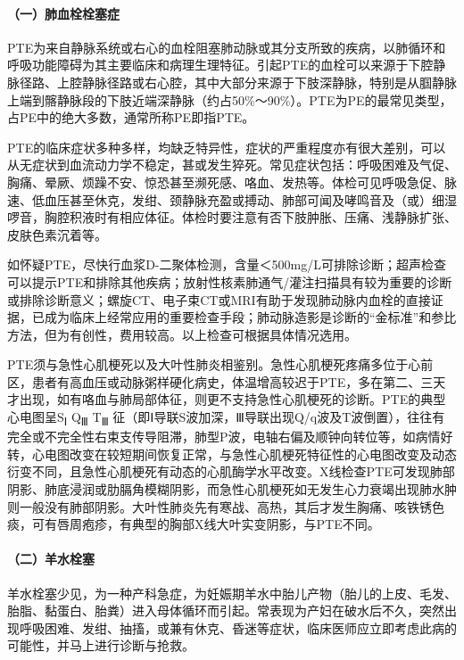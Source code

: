\paragraph{（一）肺血栓栓塞症}

PTE为来自静脉系统或右心的血栓阻塞肺动脉或其分支所致的疾病，以肺循环和呼吸功能障碍为其主要临床和病理生理特征。引起PTE的血栓可以来源于下腔静脉径路、上腔静脉径路或右心腔，其中大部分来源于下肢深静脉，特别是从腘静脉上端到髂静脉段的下肢近端深静脉（约占50\%～90\%）。PTE为PE的最常见类型，占PE中的绝大多数，通常所称PE即指PTE。

PTE的临床症状多种多样，均缺乏特异性，症状的严重程度亦有很大差别，可以从无症状到血流动力学不稳定，甚或发生猝死。常见症状包括：呼吸困难及气促、胸痛、晕厥、烦躁不安、惊恐甚至濒死感、咯血、发热等。体检可见呼吸急促、脉速、低血压甚至休克，发绀、颈静脉充盈或搏动、肺部可闻及哮鸣音及（或）细湿啰音，胸腔积液时有相应体征。体检时要注意有否下肢肿胀、压痛、浅静脉扩张、皮肤色素沉着等。

如怀疑PTE，尽快行血浆D-二聚体检测，含量＜500mg/L可排除诊断；超声检查可以提示PTE和排除其他疾病；放射性核素肺通气/灌注扫描具有较为重要的诊断或排除诊断意义；螺旋CT、电子束CT或MRI有助于发现肺动脉内血栓的直接证据，已成为临床上经常应用的重要检查手段；肺动脉造影是诊断的“金标准”和参比方法，但为有创性，费用较高。以上检查可根据具体情况选用。

PTE须与急性心肌梗死以及大叶性肺炎相鉴别。急性心肌梗死疼痛多位于心前区，患者有高血压或动脉粥样硬化病史，体温增高较迟于PTE，多在第二、三天才出现，如有咯血与肺局部体征，则更不支持急性心肌梗死的诊断。PTE的典型心电图呈S\textsubscript{Ⅰ}
Q\textsubscript{Ⅲ} T\textsubscript{Ⅲ}
征（即Ⅰ导联S波加深，Ⅲ导联出现Q/q波及T波倒置），往往有完全或不完全性右束支传导阻滞，肺型P波，电轴右偏及顺钟向转位等，如病情好转，心电图改变在较短期间恢复正常，与急性心肌梗死特征性的心电图改变及动态衍变不同，且急性心肌梗死有动态的心肌酶学水平改变。X线检查PTE可发现肺部阴影、肺底浸润或肋膈角模糊阴影，而急性心肌梗死如无发生心力衰竭出现肺水肿则一般没有肺部阴影。大叶性肺炎先有寒战、高热，其后才发生胸痛、咳铁锈色痰，可有唇周疱疹，有典型的胸部X线大叶实变阴影，与PTE不同。

\paragraph{（二）羊水栓塞}

羊水栓塞少见，为一种产科急症，为妊娠期羊水中胎儿产物（胎儿的上皮、毛发、胎脂、黏蛋白、胎粪）进入母体循环而引起。常表现为产妇在破水后不久，突然出现呼吸困难、发绀、抽搐，或兼有休克、昏迷等症状，临床医师应立即考虑此病的可能性，并马上进行诊断与抢救。

